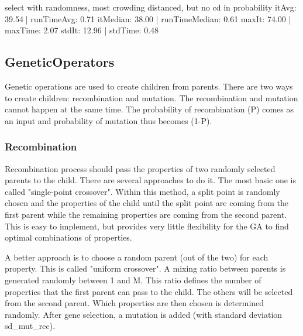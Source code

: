 select with randomness, most crowding distanced, but no cd in probability
itAvg: 39.54|	 runTimeAvg:  0.71
itMedian: 38.00	|	 runTimeMedian:  0.61
maxIt: 74.00	|	 maxTime:  2.07 
stdIt: 12.96	|	 stdTime:  0.48 





\subsection{GeneticOperators} \label{geneticOperators}

Genetic operations are used to create children from parents. There are two ways to create children: recombination and mutation. The recombination and mutation cannot happen at the same time. The probability of recombination (P) comes as an input and probability of mutation thus becomes (1-P).

\subsubsection{Recombination}

Recombination process should pass the properties of two randomly selected parents to the child. There are several approaches to do it. The most basic one is called "single-point crossover". Within this method, a split point is randomly chosen and the properties of the child until the split point are coming from the first parent while the remaining properties are coming from the second parent. This is easy to implement, but provides very little flexibility for the GA to find optimal combinations of properties. %

A better approach is to choose a random parent (out of the two) for each property. This is called "uniform crossover". A mixing ratio between parents is generated randomly between 1 and M. This ratio defines the number of properties that the first parent can pass to the child. The others will be selected from the second parent. Which properties are then chosen is determined randomly. After gene selection, a mutation is added (with standard deviation sd_mut_rec).

